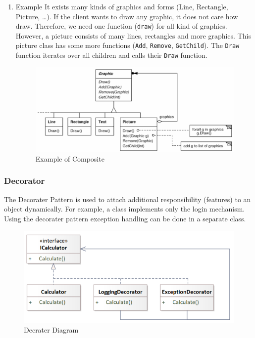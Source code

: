 \documentclass[11pt]{article}
\begin{document}
\begin{enumerate}
\item Example
\label{sec:org34299b6}
It exists many kinds of graphics and forms (Line, Rectangle, Picture, \ldots{}).
If the client wants to draw any graphic, it does not care how draw.
Therefore, we need one function (\texttt{draw}) for all kind of graphics.
However, a picture consists of many lines, rectangles and more graphics.
This picture class has some more functions (\texttt{Add}, \texttt{Remove}, \texttt{GetChild}).
The \texttt{Draw} function iterates over all children and calls their \texttt{Draw} function.




\begin{figure}[htbp]
\centering
\includegraphics[width=.9\linewidth]{img/example_of_composite.png}
\caption{\label{fig:example-of-composite}Example of Composite}
\end{figure}
\end{enumerate}
\subsubsection{Decorator}
\label{sec:org3400073}
The Decorater Pattern is used to attach additional responsibility (features) to an object dynamically.
For example, a class implements only the login mechanism.
Using the decorater pattern exception handling can be done in a separate class.


\begin{figure}[htbp]
\centering
\includegraphics[width=.9\linewidth]{img/decorater.png}
\caption{\label{fig:decrater-diagram}Decrater Diagram}
\end{figure}
\end{document}
